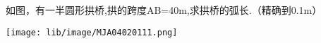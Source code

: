 如图，有一半圆形拱桥,拱的跨度AB=40m,求拱桥的弧长.（精确到0.1m）

\begin{flushright}

    \texttt{[image: lib/image/MJA04020111.png]}

\end{flushright}



